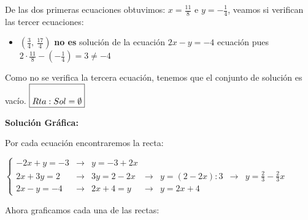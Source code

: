 \documentclass[11pt]{article}
\begin{document}
\begin{enumerate}[\hspace{-5mm} 1) ]
\begin{enumerate}[a)]
\begin{enumerate}[a)]
\begin{enumerate}[i)]
De las dos primeras ecuaciones obtuvimos: $x= \tfrac{11}{8}$ e $y=-\tfrac{1}{4}$, veamos si verifican las tercer ecuaciones:
\bigskip  

\begin{itemize}
    \item $\left( \tfrac{3}{4}, \, \tfrac{17}{4} \right)$ {\bf no  es } solución de la ecuación $ 2x-y = -4 $ ecuación pues  $2 \cdot \tfrac{11}{8} - \left(  -\tfrac{1}{4} \right)  = 3 \neq -4 $

\end{itemize}



Como no se verifica la tercera ecuación, tenemos que el conjunto de solución es vacío. \hfill   $\boxed{\rule{0mm}{7mm}  Rta:   Sol=\emptyset }$

 
\bigskip 

 



{\bf Solución Gráfica: }


Por cada ecuación  encontraremos la recta:
\bigskip

\hspace{-4mm}
$\left\{ \begin{array}{lccclccl} 
-2x+y = -3 &\longrightarrow&   \boxed{y = -3 +2x } 
\\[4mm]%
2x+3y = 2  &\longrightarrow&    3y = 2-2x & \longrightarrow & y = (2-2x): 3 & \longrightarrow & \boxed{y = \tfrac{2}{3}- \tfrac{2}{3} x }
\\[4mm]%
 2x-y = -4 &\longrightarrow&   2x +4= y & \longrightarrow & \boxed{y = 2x+4 }
\end{array}\right. $
 



\bigskip 

Ahora graficamos cada una de las rectas:




\begin{minipage}{.5\textwidth}
\begin{center}
    



 
\end{center}
\end{minipage}
\end{enumerate}
\end{enumerate}
\end{enumerate}
\end{enumerate}
\end{document}
